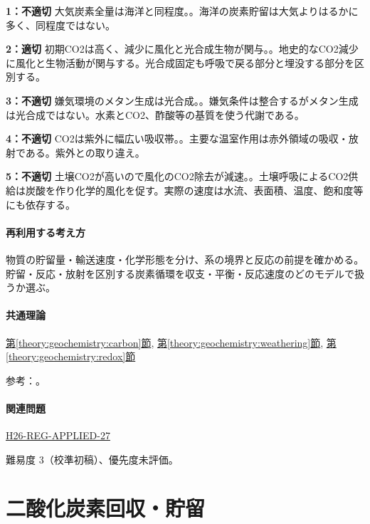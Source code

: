 \noindent\textbf{1：不適切} 大気炭素全量は海洋と同程度。。海洋の炭素貯留は大気よりはるかに多く、同程度ではない。\par

\noindent\textbf{2：適切} 初期CO2は高く、減少に風化と光合成生物が関与。。地史的なCO2減少に風化と生物活動が関与する。光合成固定も呼吸で戻る部分と埋没する部分を区別する。\par

\noindent\textbf{3：不適切} 嫌気環境のメタン生成は光合成。。嫌気条件は整合するがメタン生成は光合成ではない。水素とCO2、酢酸等の基質を使う代謝である。\par

\noindent\textbf{4：不適切} CO2は紫外に幅広い吸収帯。。主要な温室作用は赤外領域の吸収・放射である。紫外との取り違え。\par

\noindent\textbf{5：不適切} 土壌CO2が高いので風化のCO2除去が減速。。土壌呼吸によるCO2供給は炭酸を作り化学的風化を促す。実際の速度は水流、表面積、温度、飽和度等にも依存する。\par

\paragraph{再利用する考え方} 物質の貯留量・輸送速度・化学形態を分け、系の境界と反応の前提を確かめる。貯留・反応・放射を区別する炭素循環を収支・平衡・反応速度のどのモデルで扱うか選ぶ。

\paragraph{共通理論} \hyperref[theory:geochemistry:carbon]{第\ref*{theory:geochemistry:carbon}節}, \hyperref[theory:geochemistry:weathering]{第\ref*{theory:geochemistry:weathering}節}, \hyperref[theory:geochemistry:redox]{第\ref*{theory:geochemistry:redox}節}

\par 参考：\cite{gc_carbon,atm_noaa_ghg,gc_redox}。

\paragraph{関連問題} \hyperref[q:h26-reg-applied-27]{H26-REG-APPLIED-27}

\par 難易度 3（校準初稿）、優先度未評価。

\section{二酸化炭素回収・貯留}


